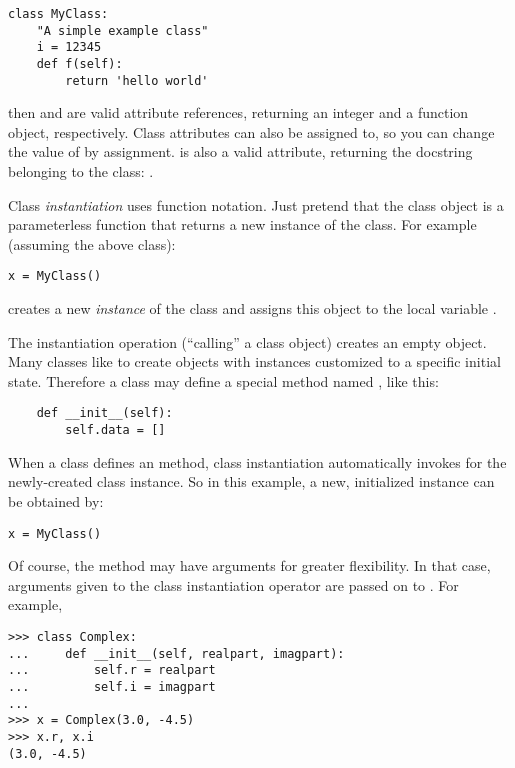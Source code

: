 \documentclass{manual}
\begin{document}
\begin{verbatim}
class MyClass:
    "A simple example class"
    i = 12345
    def f(self):
        return 'hello world'
\end{verbatim}

then  and  are valid attribute
references, returning an integer and a function object, respectively.
Class attributes can also be assigned to, so you can change the value
of  by assignment.   is also a valid
attribute, returning the docstring belonging to the class: . 

Class \emph{instantiation} uses function notation.  Just pretend that
the class object is a parameterless function that returns a new
instance of the class.  For example (assuming the above class):

\begin{verbatim}
x = MyClass()
\end{verbatim}

creates a new \emph{instance} of the class and assigns this object to
the local variable .

The instantiation operation (``calling'' a class object) creates an
empty object.  Many classes like to create objects with instances
customized to a specific initial state.
Therefore a class may define a special method named
, like this:

\begin{verbatim}
    def __init__(self):
        self.data = []
\end{verbatim}

When a class defines an  method, class
instantiation automatically invokes  for the
newly-created class instance.  So in this example, a new, initialized
instance can be obtained by:

\begin{verbatim}
x = MyClass()
\end{verbatim}

Of course, the  method may have arguments for
greater flexibility.  In that case, arguments given to the class
instantiation operator are passed on to .  For
example,

\begin{verbatim}
>>> class Complex:
...     def __init__(self, realpart, imagpart):
...         self.r = realpart
...         self.i = imagpart
... 
>>> x = Complex(3.0, -4.5)
>>> x.r, x.i
(3.0, -4.5)
\end{verbatim}
\end{document}
